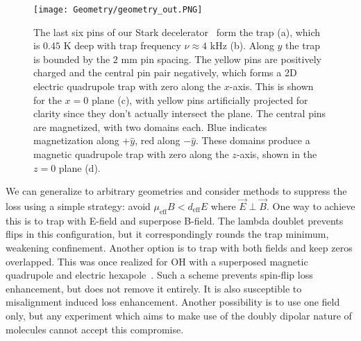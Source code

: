 \documentclass[%
 reprint,
 amsmath,amssymb,
 aps,
prl,
]{revtex4-1}
\newcommand{\epb}{{$\vec{E}\!\perp\!\vec{B}$}}
\begin{document}
\begin{figure}[tb]
\texttt{[image: Geometry/geometry\_out.PNG]}%
\caption{
The last six pins of our Stark decelerator~\cite{Sawyer2008} form the trap (a), which is $0.45\text{ K}$ deep with trap frequency $\nu\approx4\text{ kHz}$ (b). Along $y$ the trap is bounded by the $2\text{ mm}$ pin spacing. The yellow pins are positively charged and the central pin pair negatively, which forms a 2D electric quadrupole trap with zero along the $x$-axis. This is shown for the $x=0$ plane (c), with yellow pins artificially projected for clarity since they don't actually intersect the plane. The central pins are magnetized, with two domains each. Blue indicates magnetization along $+\hat{y}$, red along $-\hat{y}$. These domains produce a magnetic quadrupole trap with zero along the $z$-axis, shown in the $z=0$ plane (d). %
\label{fig:CAD}}
\end{figure}

We can generalize to arbitrary geometries and consider methods to suppress the loss using a simple strategy: avoid $\mu_\text{eff}B < d_\text{eff}E$ where \epb. One way to achieve this is to trap with E-field and superpose B-field. The lambda doublet prevents flips in this configuration, but it correspondingly rounds the trap minimum, weakening confinement. Another option is to trap with both fields and keep zeros overlapped. This was once realized for OH with a superposed magnetic quadrupole and electric hexapole~\cite{Sawyer2007}. Such a scheme prevents spin-flip loss enhancement, but does not remove it entirely. It is also susceptible to misalignment induced loss enhancement. Another possibility is to use one field only, but any experiment which aims to make use of the doubly dipolar nature of molecules cannot accept this compromise. 
\end{document}

